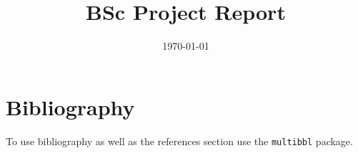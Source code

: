 \documentclass[sotoncolour]{uosthesis}  %
\title       {BSc Project Report}
\date        {\today}
\begin{document}
\raggedright           %

\frontmatter
\maketitle
\begin{abstract}

\end{abstract}
\tableofcontents
\listoffigures
\listoftables
{} %
\lstlistoflistings
\listofaddmaterial
\mainmatter





\appendix

\backmatter


\chapter{Bibliography}
To use bibliography as well as the references section use the \texttt{multibbl} package.
\end{document}
